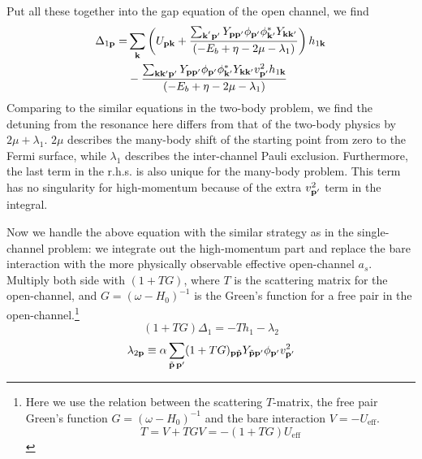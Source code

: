 \documentclass[reprint,pra]{revtex4-1}
\begin{document}
Put all these together into the gap equation of the open channel, we find 
\begin{equation*}
\begin{split}
\Delta_{1\mathbf{p}}=&\sum_{\mathbf{k}}\left(U_{\mathbf{p}\mathbf{k}}+
	\frac{\sum_{\mathbf{k}^{'}\mathbf{p}'} Y_{\mathbf{p}\mathbf{p}'}{\phi_{\mathbf{p}'}}{\phi_{\mathbf{k}'}^{*}}{Y_{\mathbf{k}\mathbf{k}'}}}
		{\left(-E_{b}+\eta-2\mu-\lambda_{1}\right)}\right){{h_{1\mathbf{k}}}}\\
	&-\frac{\sum_{\mathbf{k}\mathbf{k}{'}\mathbf{p}'} Y_{\mathbf{p}\mathbf{p}'}{\phi_{\mathbf{p}'}}{\phi_{\mathbf{k}'}^{*}}{Y_{\mathbf{k}\mathbf{k}'}}v_{\mathbf{p}'}^{2}{h_{1\mathbf{k}}}}
		{\left(-E_{b}+\eta-2\mu-\lambda_{1}\right)}{}
\end{split}
\end{equation*}
Comparing to the similar equations in the two-body problem, we find the detuning from the resonance here differs from that of the two-body physics by $2\mu+\lambda_1$.  $2\mu$ describes the many-body shift of the starting point from zero to the Fermi surface, while $\lambda_1$ describes the inter-channel Pauli exclusion.  Furthermore, the last term in the r.h.s.  is also unique for the many-body problem.  This term has no singularity for high-momentum because of the extra $v_{\mathbf{p}'}^2$ term in the integral. 

Now we handle the above equation with  the similar strategy as in the single-channel problem: we integrate out the high-momentum part and replace the bare interaction with the more physically observable effective open-channel $a_s$.  
Multiply both side with $(1+TG)$,  where $T$ is the scattering matrix for the open-channel, and $G=(\omega-H_{0})^{-1}$ is the Green's function for a free pair in the open-channel.\footnote{Here we use the relation between the scattering $T$-matrix, the free pair Green's function $G=(\omega-H_{0})^{-1}$ and the bare interaction $V=-U_{\text{eff}}$.
\begin{equation*}
T=V+TGV=-(1+TG)U_{\text{eff}}
\end{equation*}
 }
\begin{equation*}
(1+TG)\Delta_{1}=-Th_{1}-\lambda_{2}
\end{equation*}
\begin{equation}\label{eq:pathInt2:lambda2}
\lambda_{2\mathbf{p}}\equiv\alpha\sum_{\tilde{\mathbf{p}}\,\mathbf{p}'}(1+TG)_{\mathbf{p}\tilde{\mathbf{p}}} Y_{\tilde{\mathbf{p}}\mathbf{p}'}{\phi_{\mathbf{p}'}}v_{\mathbf{p}'}^{2}
\end{equation}
\end{document}

